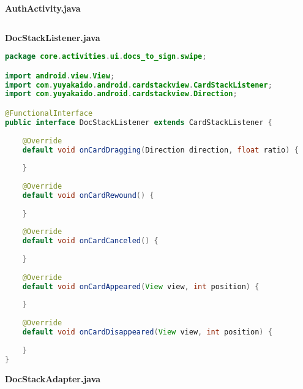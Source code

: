 \textbf{AuthActivity.java}
\begin{lstlisting}[language=Java]

\end{lstlisting}
\textbf{DocStackListener.java}
\begin{lstlisting}[language=Java]
package core.activities.ui.docs_to_sign.swipe;

import android.view.View;
import com.yuyakaido.android.cardstackview.CardStackListener;
import com.yuyakaido.android.cardstackview.Direction;

@FunctionalInterface
public interface DocStackListener extends CardStackListener {
	
	@Override
	default void onCardDragging(Direction direction, float ratio) {
		
	}
	
	@Override
	default void onCardRewound() {
		
	}
	
	@Override
	default void onCardCanceled() {
		
	}
	
	@Override
	default void onCardAppeared(View view, int position) {
		
	}
	
	@Override
	default void onCardDisappeared(View view, int position) {
		
	}
}

\end{lstlisting}
\textbf{DocStackAdapter.java}
